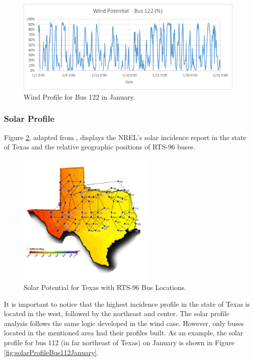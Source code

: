 \documentclass[12pt,LUDisStyle,twosided]{book}
\begin{document}
\begin{figure}[H] 
  \includegraphics[width=\textwidth,keepaspectratio]{windPotentialBus122.png}
  \caption{Wind Profile for Bus 122 in January.}
  \label{fig:windProfileBus122January}
\end{figure}

\newpage
\subsubsection{Solar Profile}

Figure \ref{fig:texasSolarProfile}, adapted from \cite{texasSolarProfile}, displays the NREL's solar incidence report in the state of Texas and the relative geographic positions of RTS-96 buses. 

\begin{figure}[H] 
	\begin{center}
		\includegraphics[width=0.6\textwidth,height=\textheight,keepaspectratio]{texasSolarProfileWithBuses.png}
	  	\caption{Solar Potential for Texas with RTS-96 Bus Locations.}	  		\label{fig:texasSolarProfile}
	\end{center}
\end{figure}


It is important to notice that the highest incidence profile in the state of Texas is located in the west, followed by the northeast and center. The solar profile analysis follows the same logic developed in the wind case. However, only buses located in the mentioned area had their profiles built. As an example, the solar profile for bus 112 (in far northeast of Texas) on January is shown in Figure \ref{fig:solarProfileBus112January}.
\end{document}
